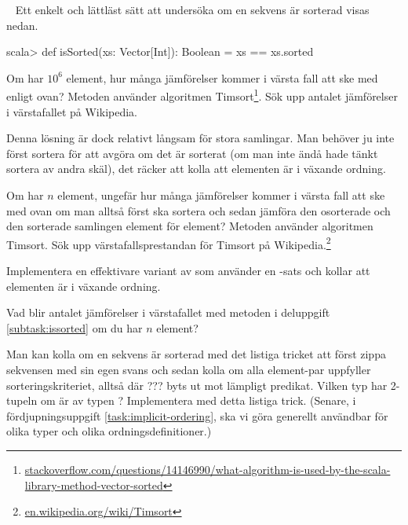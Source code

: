 \QUESTEND


\clearpage

\ExtraTasks %





\QUESTBEGIN

\Task \label{task:isSorted} \what~   Ett enkelt och lättläst sätt att undersöka om en sekvens är sorterad visas nedan.
\begin{REPL}
scala> def isSorted(xs: Vector[Int]): Boolean = xs == xs.sorted
\end{REPL}


\Subtask\Pen  Om  har $10^6$ element, hur många jämförelser kommer i värsta fall att ske med  enligt ovan? Metoden  använder algoritmen Timsort\footnote{\href{http://stackoverflow.com/questions/14146990/what-algorithm-is-used-by-the-scala-library-method-vector-sorted}{stackoverflow.com/questions/14146990/what-algorithm-is-used-by-the-scala-library-method-vector-sorted}}. Sök upp antalet jämförelser i värstafallet på Wikipedia.

Denna lösning är dock relativt långsam för stora samlingar. Man behöver ju inte först sortera  för att avgöra om det är sorterat (om man inte ändå hade tänkt sortera av andra skäl), det räcker att kolla att elementen är i växande ordning.

\Subtask\Pen  Om  har $n$ element, ungefär hur många jämförelser kommer i värsta fall att ske med  ovan om man alltså först ska sortera och sedan jämföra den osorterade och den sorterade samlingen element för element? Metoden  använder algoritmen Timsort. Sök upp värstafallsprestandan för Timsort på Wikipedia.\footnote{\href{https://en.wikipedia.org/wiki/Timsort}{en.wikipedia.org/wiki/Timsort}}

\Subtask\label{subtask:issorted} Implementera en effektivare variant av  som använder en -sats och kollar att elementen är i växande ordning.

\Subtask\Pen Vad blir antalet jämförelser i värstafallet med metoden i deluppgift \ref{subtask:issorted} om du har $n$ element?


\Subtask \label{subtask:isSorted-zip} Man kan kolla om en sekvens är sorterad med det listiga tricket att först zippa sekvensen med sin egen svans och sedan kolla om alla element-par uppfyller sorteringskriteriet, alltså  där ??? byts ut mot lämpligt predikat. Vilken typ har 2-tupeln  om  är av typen ? Implementera  med detta listiga trick. (Senare, i fördjupningsuppgift \ref{task:implicit-ordering}, ska vi göra  generellt användbar för olika typer och olika ordningsdefinitioner.)

